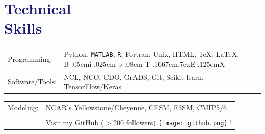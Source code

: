 \documentclass[margin,line,palatino,courier,10pt]{res}
\def\BibTeX{{\rm B\kern-.05em{\sc i\kern-.025em b}\kern-.08em
    T\kern-.1667em\lower.7ex\hbox{E}\kern-.125emX}}
\begin{document}
\begin{resume}
\vspace{-0.1in}
\noindent\textcolor{MidnightBlue}{\makebox[\linewidth][r]{\rule{\textwidth}{5pt}}}
\vspace{-0.3in}
\section{\sc \textcolor{MidnightBlue}{\large{\textbf{Technical \\ Skills}}}}
\vspace*{0.05in}
\begin{tabular}{@{}p{0.9in}p{6in}}

Programming: & Python, \texttt{MATLAB}, \texttt{R}, Fortran, Unix, HTML, \TeX, \LaTeX, \BibTeX \\
Software/Tools: & NCL, NCO, CDO, GrADS, Git, Scikit-learn, TensorFlow/Keras\\
\end{tabular}
\begin{tabular}{@{}p{0.9in}p{6in}}
Modeling: & NCAR's Yellowstone/Cheyenne, CESM, E3SM, CMIP5/6\\\\

& Visit my \href{https://github.com/zmlabe}{GitHub ($>$200 followers)} \texttt{[image: github.png]} !\\
\end{tabular}

\vspace{-0.1in}
\noindent\textcolor{MidnightBlue}{\makebox[\linewidth][r]{\rule{\textwidth}{5pt}}}
\vspace{-0.3in}


\end{resume}
\end{document}
